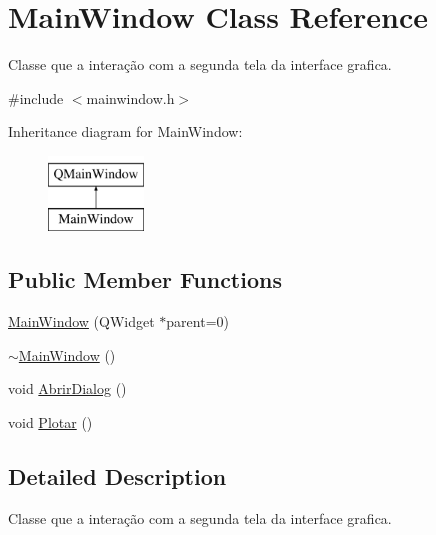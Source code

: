 \hypertarget{classMainWindow}{\section{Main\+Window Class Reference}
\label{classMainWindow}
}


Classe que a interação com a segunda tela da interface grafica.  




{\ttfamily \#include $<$mainwindow.\+h$>$}

Inheritance diagram for Main\+Window\+:\begin{figure}[H]
\begin{center}
\leavevmode
\includegraphics[height=2.000000cm]{classMainWindow}
\end{center}
\end{figure}
\subsection*{Public Member Functions}
\begin{DoxyCompactItemize}
\item 
\hyperlink{classMainWindow_a8b244be8b7b7db1b08de2a2acb9409db}{Main\+Window} (Q\+Widget $\ast$parent=0)
\item 
\hyperlink{classMainWindow_ae98d00a93bc118200eeef9f9bba1dba7}{$\sim$\+Main\+Window} ()
\item 
void \hyperlink{classMainWindow_a7c2ac5ce98b2a5de2928e730e48dcfd0}{Abrir\+Dialog} ()
\item 
void \hyperlink{classMainWindow_aa878ce12d90414ed30463be34b4eea91}{Plotar} ()
\end{DoxyCompactItemize}


\subsection{Detailed Description}
Classe que a interação com a segunda tela da interface grafica. 

